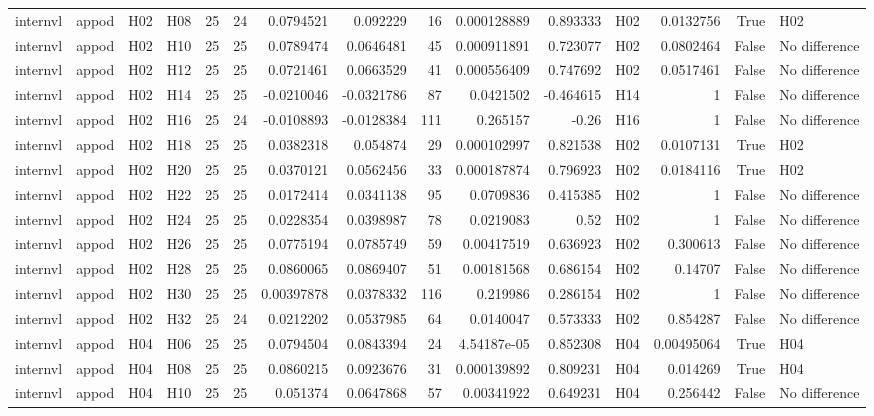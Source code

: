 \begin{longtable}{llllrrrrrrrlrrl}
internvl & appod & H02 & H08 & 25 & 24 & 0.0794521 & 0.092229 & 16 & 0.000128889 & 0.893333 & H02 & 0.0132756 & True & H02 \\
internvl & appod & H02 & H10 & 25 & 25 & 0.0789474 & 0.0646481 & 45 & 0.000911891 & 0.723077 & H02 & 0.0802464 & False & No difference \\
internvl & appod & H02 & H12 & 25 & 25 & 0.0721461 & 0.0663529 & 41 & 0.000556409 & 0.747692 & H02 & 0.0517461 & False & No difference \\
internvl & appod & H02 & H14 & 25 & 25 & -0.0210046 & -0.0321786 & 87 & 0.0421502 & -0.464615 & H14 & 1 & False & No difference \\
internvl & appod & H02 & H16 & 25 & 24 & -0.0108893 & -0.0128384 & 111 & 0.265157 & -0.26 & H16 & 1 & False & No difference \\
internvl & appod & H02 & H18 & 25 & 25 & 0.0382318 & 0.054874 & 29 & 0.000102997 & 0.821538 & H02 & 0.0107131 & True & H02 \\
internvl & appod & H02 & H20 & 25 & 25 & 0.0370121 & 0.0562456 & 33 & 0.000187874 & 0.796923 & H02 & 0.0184116 & True & H02 \\
internvl & appod & H02 & H22 & 25 & 25 & 0.0172414 & 0.0341138 & 95 & 0.0709836 & 0.415385 & H02 & 1 & False & No difference \\
internvl & appod & H02 & H24 & 25 & 25 & 0.0228354 & 0.0398987 & 78 & 0.0219083 & 0.52 & H02 & 1 & False & No difference \\
internvl & appod & H02 & H26 & 25 & 25 & 0.0775194 & 0.0785749 & 59 & 0.00417519 & 0.636923 & H02 & 0.300613 & False & No difference \\
internvl & appod & H02 & H28 & 25 & 25 & 0.0860065 & 0.0869407 & 51 & 0.00181568 & 0.686154 & H02 & 0.14707 & False & No difference \\
internvl & appod & H02 & H30 & 25 & 25 & 0.00397878 & 0.0378332 & 116 & 0.219986 & 0.286154 & H02 & 1 & False & No difference \\
internvl & appod & H02 & H32 & 25 & 24 & 0.0212202 & 0.0537985 & 64 & 0.0140047 & 0.573333 & H02 & 0.854287 & False & No difference \\
internvl & appod & H04 & H06 & 25 & 25 & 0.0794504 & 0.0843394 & 24 & 4.54187e-05 & 0.852308 & H04 & 0.00495064 & True & H04 \\
internvl & appod & H04 & H08 & 25 & 25 & 0.0860215 & 0.0923676 & 31 & 0.000139892 & 0.809231 & H04 & 0.014269 & True & H04 \\
internvl & appod & H04 & H10 & 25 & 25 & 0.051374 & 0.0647868 & 57 & 0.00341922 & 0.649231 & H04 & 0.256442 & False & No difference \\

\end{longtable}
